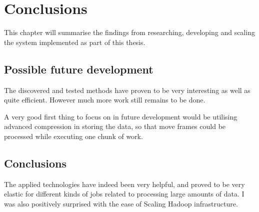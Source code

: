 \chapter{Conclusions}
\label{chap:conclusions}

This chapter will summarise the findings from researching, developing and scaling the system implemented as part of this thesis.

\section{Possible future development}
The discovered and tested methods have proven to be very interesting as well as quite efficient. However much more work still remains to be done. 

A very good first thing to focus on in future development would be utilising advanced compression in storing the data, so that move frames could be processed while executing one chunk of work.


\section{Conclusions}

The applied technologies have indeed been very helpful, and proved to be very elastic for different kinds of jobs related to processing large amounts of data. I was also positively surprised with the ease of Scaling Hadoop infrastructure.

